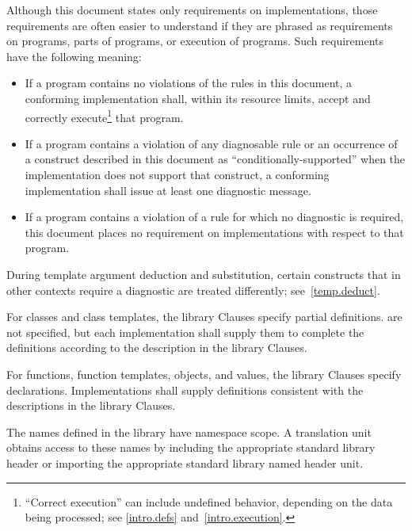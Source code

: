 \pnum
{}%
Although this document states only requirements on \Cpp{}
implementations, those requirements are often easier to understand if
they are phrased as requirements on programs, parts of programs, or
execution of programs. Such requirements have the following meaning:
\begin{itemize}
\item
If a program contains no violations of the rules in this
document, a conforming implementation shall,
within its resource limits, accept and correctly execute\footnote{``Correct execution'' can include undefined behavior, depending on
the data being processed; see \ref{intro.defs} and~\ref{intro.execution}.}
that program.
\item
{}%
If a program contains a violation of any diagnosable rule or an occurrence
of a construct described in this document as ``conditionally-supported'' when
the implementation does not support that construct, a conforming implementation
shall issue at least one diagnostic message.
\item
{}%
If a program contains a violation of a rule for which no diagnostic
is required, this document places no requirement on
implementations with respect to that program.
\end{itemize}
\begin{note}
During template argument deduction and substitution,
certain constructs that in other contexts require a diagnostic
are treated differently;
see~\ref{temp.deduct}.
\end{note}

\pnum
{}%
%
%
For classes and class templates, the library Clauses specify partial
definitions.  are not
specified, but each implementation shall supply them to complete the
definitions according to the description in the library Clauses.

\pnum
For functions, function templates, objects, and values, the library
Clauses specify declarations. Implementations shall supply definitions
consistent with the descriptions in the library Clauses.

\pnum
The names defined in the library have namespace
scope. A \Cpp{}  translation
unit obtains access to these names by including the
appropriate standard library header or importing
the appropriate standard library named header unit.


